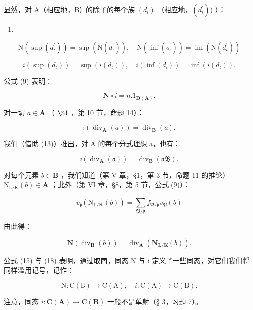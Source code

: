 显然，对 A（相应地，B）的除子的每个族 \((d_{\iota})\) （相应地，\((d_{\iota}^{\prime}))\) ）：

\begin{enumerate}
\def\labelenumi{(\arabic{enumi})}
\setcounter{enumi}{11}
\tightlist
\item
\end{enumerate}

\[
\mathrm{N} (\sup (d _ {\iota} ^ {\prime})) = \sup (\mathrm{N} (d _ {\iota} ^ {\prime})), \quad \mathrm{N} (\inf (d _ {\iota} ^ {\prime})) = \inf (\mathrm{N} (d _ {\iota} ^ {\prime}))\tag{13}
\]

\[
i \left(\sup (d _ {\iota})\right) = \sup (i (d _ {\iota})), \quad i (\inf (d _ {\iota})) = \inf (i (d _ {\iota})).
\]

公式 (9) 表明：

\[
\mathbf {N} \circ i = n. 1 _ {\mathbf {D} (\mathbf {A})}.\tag{14}
\]

对一切 \(a \in \mathbf{A}\) （ \(\S 1\) ，第 10 节，命题 14）：

\[
i \left(\operatorname{div} _ {\mathbf {A}} (a)\right) = \operatorname{div} _ {\mathbf {B}} (a).\tag{15}
\]

我们（借助 (13)）推出，对 A 的每个分式理想 a，也有：

\[
i \left(\operatorname{div} _ {\mathbf {A}} (\mathfrak {a})\right) = \operatorname{div} _ {\mathbf {B}} (\mathfrak {a B}).\tag{16}
\]

对每个元素 \(b \in \mathbf{B}\) ，我们知道（第 V 章，§1，第 3 节，命题 11 的推论）\(\mathrm{N}_{\mathrm{L / K}}(b) \in \mathbf{A}\) ；此外（第 VI 章，§8，第 5 节，公式 (9)）：

\[
v _ {\mathfrak {p}} \left(\mathrm{N} _ {\mathrm{L} / \mathbf {K}} (b)\right) = \sum_ {\mathfrak {P} / \mathfrak {p}} f _ {\mathfrak {P} / \mathfrak {p}} v _ {\mathfrak {P}} (b)\tag{17}
\]

由此得：

\[
\mathbf {N} (\operatorname{div} _ {\mathbf {B}} (b)) = \operatorname{div} _ {\mathbf {A}} (\mathbf {N} _ {\mathbf {L} / \mathbf {K}} (b)).\tag{18}
\]

公式 (15) 与 (18) 表明，通过取商，同态 N 与 i 定义了一些同态，对它们我们将同样滥用记号，记作：

\[
\mathrm{N}: \mathrm{C} (\mathrm{B}) \rightarrow \mathrm{C} (\mathrm{A}), \quad i: \mathrm{C} (\mathrm{A}) \rightarrow \mathrm{C} (\mathrm{B}).
\]

注意，同态 \(i\colon\mathbf{C}(\mathbf{A})\to\mathbf{C}(\mathbf{B})\) 一般不是单射（§ 3，习题 7）。

